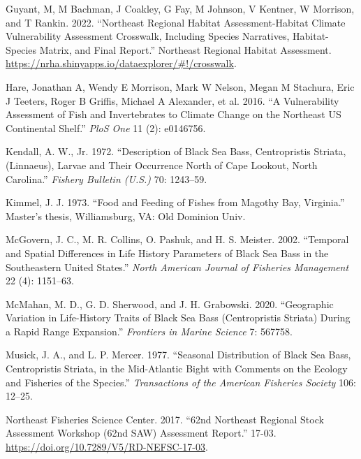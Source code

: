 \documentclass[
  letterpaper,
  DIV=11,
  numbers=noendperiod]{scrartcl}
\newlength{\cslhangindent}
\newenvironment{CSLReferences}[2] %
 {\begin{list}{}{%
  \setlength{\itemindent}{0pt}
  \setlength{\leftmargin}{0pt}
  \setlength{\parsep}{0pt}
  \ifodd #1
   \setlength{\leftmargin}{\cslhangindent}
   \setlength{\itemindent}{-1\cslhangindent}
  \fi
  \setlength{\itemsep}{#2\baselineskip}}}
 {\end{list}}
\begin{document}
\begin{CSLReferences}{1}{0}
Guyant, M, M Bachman, J Coakley, G Fay, M Johnson, V Kentner, W
Morrison, and T Rankin. 2022. {``Northeast Regional Habitat
Assessment-Habitat Climate Vulnerability Assessment Crosswalk, Including
Species Narratives, Habitat-Species Matrix, and Final Report.''}
Northeast Regional Habitat Assessment.
\url{https://nrha.shinyapps.io/dataexplorer/\#!/crosswalk}.

Hare, Jonathan A, Wendy E Morrison, Mark W Nelson, Megan M Stachura,
Eric J Teeters, Roger B Griffis, Michael A Alexander, et al. 2016. {``A
Vulnerability Assessment of Fish and Invertebrates to Climate Change on
the Northeast US Continental Shelf.''} \emph{PloS One} 11 (2): e0146756.

Kendall, A. W., Jr. 1972. {``Description of Black Sea Bass,
{C}entropristis Striata, ({L}innaeus), Larvae and Their Occurrence North
of {C}ape {L}ookout, {N}orth {C}arolina.''} \emph{Fishery Bulletin
(U.S.)} 70: 1243--59.

Kimmel, J. J. 1973. {``Food and Feeding of Fishes from {M}agothy {B}ay,
{V}irginia.''} Master's thesis, Williamsburg, VA: Old Dominion Univ.

McGovern, J. C., M. R. Collins, O. Pashuk, and H. S. Meister. 2002.
{``Temporal and Spatial Differences in Life History Parameters of Black
Sea Bass in the Southeastern {U}nited {S}tates.''} \emph{North American
Journal of Fisheries Management} 22 (4): 1151--63.

McMahan, M. D., G. D. Sherwood, and J. H. Grabowski. 2020. {``Geographic
Variation in Life-History Traits of Black Sea Bass ({C}entropristis
Striata) During a Rapid Range Expansion.''} \emph{Frontiers in Marine
Science} 7: 567758.

Musick, J. A., and L. P. Mercer. 1977. {``Seasonal Distribution of Black
Sea Bass, {C}entropristis Striata, in the {M}id-{A}tlantic {B}ight with
Comments on the Ecology and Fisheries of the Species.''}
\emph{Transactions of the American Fisheries Society} 106: 12--25.

Northeast Fisheries Science Center. 2017. {``62nd {N}ortheast {R}egional
{S}tock {A}ssessment {W}orkshop (62nd {SAW}) {A}ssessment {R}eport.''}
17-03. \url{https://doi.org/10.7289/V5/RD-NEFSC-17-03}.


\end{CSLReferences}
\end{document}
